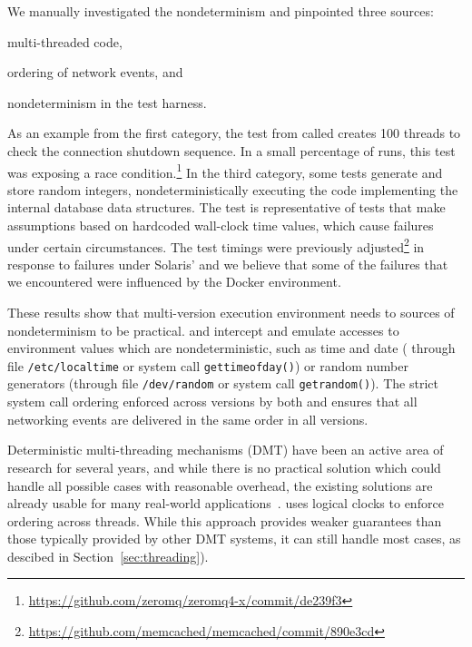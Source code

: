 We manually investigated the nondeterminism and pinpointed three
sources:%
\begin{inparaenum}[(1)]
\item multi-threaded code,
\item ordering of network events, and
\item nondeterminism in the test harness.
\end{inparaenum} As an example from the first category, the test from \zeromq
called  creates 100 threads to check the connection
shutdown sequence. In a small percentage of runs, this test was exposing a race
condition.\footnote{\url{https://github.com/zeromq/zeromq4-x/commit/de239f3}}
In the third category, some \redis tests generate and store random integers,
nondeterministically executing the code implementing the internal database data
structures.  The \memcached test  is representative of tests
that make assumptions based on hardcoded wall-clock time values, which cause
failures under certain circumstances. The test timings were previously
adjusted\footnote{\url{https://github.com/memcached/memcached/commit/890e3cd}}
in response to failures under Solaris'  and we believe that some of
the failures that we encountered were influenced by the Docker environment.

These results show that multi-version execution environment needs to sources of
nondeterminism to be practical. \varan and \mx intercept and emulate accesses
to environment values which are nondeterministic, such as time and date (\eg
through file \lstinline`/etc/localtime` or system call
\lstinline`gettimeofday()`) or random number generators (\eg through file
\lstinline`/dev/random` or system call \lstinline`getrandom()`). The strict
system call ordering enforced across versions by both \varan and \mx ensures
that all networking events are delivered in the same order in all versions.

Deterministic multi-threading mechanisms (DMT) have been an active area of
research for several years, and while there is no practical solution which
could handle all possible cases with reasonable overhead, the existing
solutions are already usable for many real-world
applications~\cite{coredet:asplos10,dthreads:sosp11}. \varan uses logical
clocks to enforce ordering across threads. While this approach provides weaker
guarantees than those typically provided by other DMT systems, it can still
handle most cases, as descibed in Section~\ref{sec:threading}).

